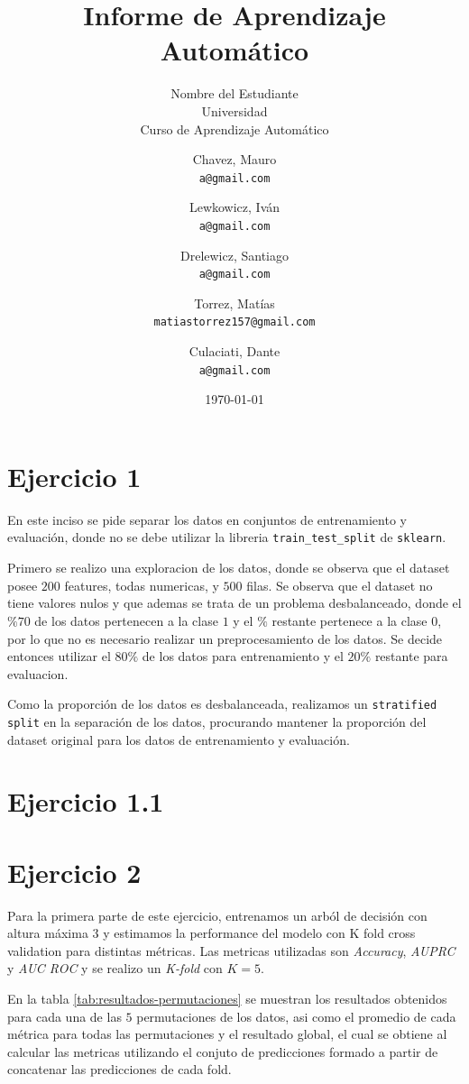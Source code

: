 \documentclass[12pt,a4paper]{article}
\title{Informe de Aprendizaje Automático}
\author{Nombre del Estudiante \\ Universidad \\ Curso de Aprendizaje Automático}
\author{
    Chavez, Mauro \\
    \texttt{a@gmail.com}
    \and
    Lewkowicz, Iván \\
    \texttt{a@gmail.com}
    \and
    Drelewicz, Santiago \\
    \texttt{a@gmail.com}
    \and
    Torrez, Matías \\
    \texttt{matiastorrez157@gmail.com}
    \and
    Culaciati, Dante \\
    \texttt{a@gmail.com}
}
\date{\today}
\begin{document}
\maketitle
\newpage
\tableofcontents
\newpage

\section{Ejercicio 1}
\par En este inciso se pide separar los datos en conjuntos de entrenamiento y evaluación, donde no se debe utilizar la libreria \texttt{train\_test\_split} de \texttt{sklearn}.

\par Primero se realizo una exploracion de los datos, donde se observa que el dataset posee $200$ features, todas numericas, y $500$ filas.
Se observa que el dataset no tiene valores nulos y que ademas se trata de un problema desbalanceado, donde el $\%70$ de los datos pertenecen a la clase $1$ y el $\%$ restante pertenece a la clase $0$, por lo que no es necesario realizar un preprocesamiento de los datos. 
Se decide entonces utilizar el $80\%$ de los datos para entrenamiento y el $20\%$ restante para evaluacion.

\par Como la proporción de los datos es desbalanceada, realizamos un \texttt{stratified split} en la separación de los datos, procurando mantener la proporción del dataset original para los datos de entrenamiento y evaluación. 

\section{Ejercicio 1.1}
\section{Ejercicio 2}
\par Para la primera parte de este ejercicio, entrenamos un arból de decisión con altura máxima 3 y estimamos la performance del modelo con K fold cross validation para distintas métricas. 
Las metricas utilizadas son \textit{Accuracy}, \textit{AUPRC} y \textit{AUC ROC} y se realizo un \textit{K-fold} con $K=5$.
\par En la tabla \ref{tab:resultados-permutaciones} se muestran los resultados obtenidos para cada una de las $5$ permutaciones de los datos, asi como el promedio de cada métrica para todas las permutaciones y el resultado global,
el cual se obtiene al calcular las metricas utilizando el conjuto de predicciones formado a partir de concatenar las predicciones de cada fold.
\end{document}

